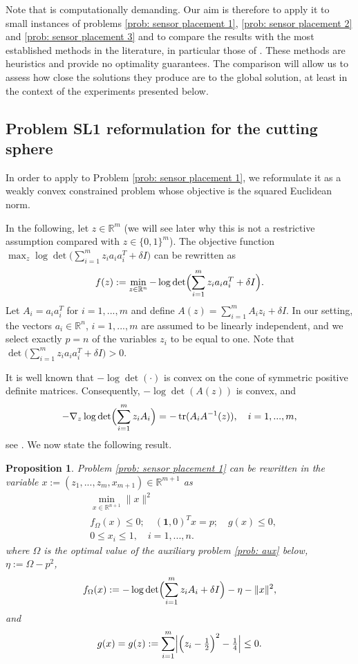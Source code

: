 \documentclass[12pt]{amsart}
\theoremstyle{plain}
\newtheorem{proposition}[theorem]{Proposition}
\theoremstyle{definition}
\begin{document}
Note that \cite[Algorithm 3]{bednarczuk2026outer} is computationally demanding. Our aim is therefore to apply it to small instances of problems \eqref{prob: sensor placement 1}, \eqref{prob: sensor placement 2} and \eqref{prob: sensor placement 3} and to compare the results with the most established methods in the literature, in particular those of \cite{Joshi2009, manohar2017data}. These methods are heuristics and provide no optimality guarantees. The comparison will allow us to assess how close the solutions they produce are to the global solution, at least in the context of the experiments presented below.

\subsection{Problem SL1 reformulation for the cutting sphere}

In order to apply \cite[Algorithm 3]{bednarczuk2026outer} to Problem \eqref{prob: sensor placement 1}, we reformulate it as a weakly convex constrained problem whose objective is the squared Euclidean norm.

In the following, let $z\in \mathbb{R}^m$ (we will see later why this is not a restrictive assumption compared with $z\in \{0,1\}^m$). The objective function $\max_z \log\det\bigl(\sum_{i=1}^m z_i a_i a_i^T + \delta I\bigr)$ can be rewritten as
\[
f(z) := \min_{z\in \mathbb{R}^n} -\log\det\Bigl( \sum_{i=1}^m z_i a_i a_i^T + \delta I \Bigr).
\]
Let $A_i = a_i a_i^T$ for $i=1,...,m$ and define $A(z) = \sum_{i=1}^m A_i z_i + \delta I$. In our setting, the vectors $a_i\in \mathbb{R}^n$, $i=1,...,m$ are assumed to be linearly independent, and we select exactly $p = n$ of the variables $z_i$ to be equal to one. Note that $\det\bigl(\sum_{i=1}^m z_i a_i a_i^T + \delta I\bigr) > 0$.

It is well known that $-\log\det(\cdot)$ is convex on the cone of symmetric positive definite matrices. Consequently, $-\log\det(A(z))$ is convex, and
\[
-\nabla_z\log\det\Bigl( \sum_{i=1}^m z_i A_i \Bigr) = -\operatorname{tr}(A_i A^{-1}(z)), \quad i=1,...,m,
\]
see \cite[Example A.3]{Joshi2009}. We now state the following result.

\begin{proposition}
 Problem \eqref{prob: sensor placement 1} can be rewritten in the variable $x:=(z_1,...,z_m, x_{m+1})\in \mathbb{R}^{m+1}$ as
\begin{equation}
\label{prob: SL final}
\tag{SL1.2}
\begin{split}
& \min_{x \in \mathbb{R}^{n+1}} \|x\|^2 \\
& f_\Omega(x)\le 0;\quad (\mathbf{1},0)^T x = p;\quad g(x)\le 0, \\
& 0\le x_i \le 1,\quad i=1,...,n.
\end{split}
\end{equation}
where $\Omega$ is the optimal value of the auxiliary problem \eqref{prob: aux} below, $\eta := \Omega - p^2$,
\[
f_\Omega(x) := -\log\det\Bigl( \sum_{i=1}^m z_i A_i + \delta I \Bigr) - \eta - \|x\|^2,
\]
and
\[
g(x) = g(z) := \sum_{i=1}^m \Bigl| \Bigl(z_i - \tfrac12\Bigr)^2 - \tfrac14 \Bigr| \le 0.
\]
\end{proposition}
\end{document}
